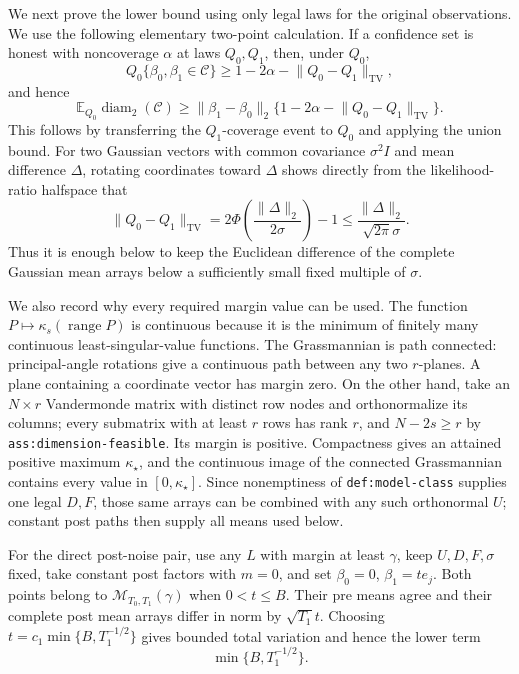 We next prove the lower bound using only legal laws for the original observations.  We use the following elementary two-point calculation.  If a confidence set is honest with noncoverage \(\alpha\) at laws \(Q_0,Q_1\), then, under \(Q_0\),
\[
 Q_0\{\beta_0,\beta_1\in\mathcal C\}
 \ge1-2\alpha-\lVert Q_0-Q_1\rVert_{\mathrm{TV}},
\]
and hence
\[
 \mathbb E_{Q_0}\operatorname{diam}_2(\mathcal C)
 \ge\lVert\beta_1-\beta_0\rVert_2
 \{1-2\alpha-\lVert Q_0-Q_1\rVert_{\mathrm{TV}}\}.
\]
This follows by transferring the \(Q_1\)-coverage event to \(Q_0\) and applying the union bound.  For two Gaussian vectors with common covariance \(\sigma^2I\) and mean difference \(\Delta\), rotating coordinates toward \(\Delta\) shows directly from the likelihood-ratio halfspace that
\[
 \lVert Q_0-Q_1\rVert_{\mathrm{TV}}
 =2\Phi\left(\frac{\lVert\Delta\rVert_2}{2\sigma}\right)-1
 \le\frac{\lVert\Delta\rVert_2}{\sqrt{2\pi}\sigma}.
\]
Thus it is enough below to keep the Euclidean difference of the complete Gaussian mean arrays below a sufficiently small fixed multiple of \(\sigma\).

We also record why every required margin value can be used.  The function \(P\mapsto\kappa_s(\operatorname{range}P)\) is continuous because it is the minimum of finitely many continuous least-singular-value functions.  The Grassmannian is path connected: principal-angle rotations give a continuous path between any two \(r\)-planes.  A plane containing a coordinate vector has margin zero.  On the other hand, take an \(N\times r\) Vandermonde matrix with distinct row nodes and orthonormalize its columns; every submatrix with at least \(r\) rows has rank \(r\), and \(N-2s\ge r\) by \texttt{ass:dimension-feasible}.  Its margin is positive.  Compactness gives an attained positive maximum \(\kappa_\star\), and the continuous image of the connected Grassmannian contains every value in \([0,\kappa_\star]\).  Since nonemptiness of \texttt{def:model-class} supplies one legal \(D,F\), those same arrays can be combined with any such orthonormal \(U\); constant post paths then supply all means used below.

For the direct post-noise pair, use any \(L\) with margin at least \(\gamma\), keep \(U,D,F,\sigma\) fixed, take constant post factors with \(m=0\), and set \(\beta_0=0\), \(\beta_1=t e_j\).  Both points belong to \(\mathcal M_{T_0,T_1}(\gamma)\) when \(0<t\le B\).  Their pre means agree and their complete post mean arrays differ in norm by \(\sqrt{T_1}t\).  Choosing \(t=c_1\min\{B,T_1^{-1/2}\}\) gives bounded total variation and hence the lower term
\[
 \min\{B,T_1^{-1/2}\}.
\]

